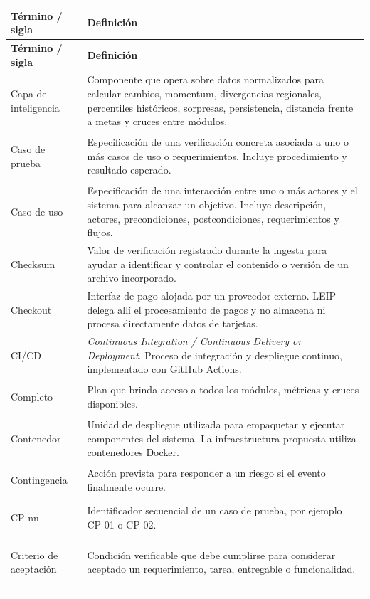 \documentclass[11pt,a4paper]{article}
\makeatletter
\newcommand{\proyectoNombre}{LEIP}
\newenvironment{glosario}{%
  \renewcommand{\arraystretch}{1.18}%
  \begin{longtable}{@{}>{\raggedright\arraybackslash\bfseries}p{4.0cm} >{\raggedright\arraybackslash}p{10.7cm}@{}}
  \toprule
  \textbf{T\'ermino / sigla} & \textbf{Definici\'on} \\
  \midrule
  \endfirsthead
  \toprule
  \textbf{T\'ermino / sigla} & \textbf{Definici\'on} \\
  \midrule
  \endhead
  \bottomrule
  \endfoot
}{%
  \end{longtable}
  \renewcommand{\arraystretch}{1}%
}
\makeatother
\begin{document}
\begin{glosario}
Capa de inteligencia & Componente que opera sobre datos normalizados para calcular cambios, momentum, divergencias regionales, percentiles hist\'oricos, sorpresas, persistencia, distancia frente a metas y cruces entre m\'odulos. \\
\addlinespace

Caso de prueba & Especificaci\'on de una verificaci\'on concreta asociada a uno o m\'as casos de uso o requerimientos. Incluye procedimiento y resultado esperado. \\
\addlinespace

Caso de uso & Especificaci\'on de una interacci\'on entre uno o m\'as actores y el sistema para alcanzar un objetivo. Incluye descripci\'on, actores, precondiciones, postcondiciones, requerimientos y flujos. \\
\addlinespace

Checksum & Valor de verificaci\'on registrado durante la ingesta para ayudar a identificar y controlar el contenido o versi\'on de un archivo incorporado. \\
\addlinespace

Checkout & Interfaz de pago alojada por un proveedor externo. \proyectoNombre{} delega all\'i el procesamiento de pagos y no almacena ni procesa directamente datos de tarjetas. \\
\addlinespace

CI/CD & \emph{Continuous Integration / Continuous Delivery or Deployment}. Proceso de integraci\'on y despliegue continuo, implementado con GitHub Actions. \\
\addlinespace

Completo & Plan que brinda acceso a todos los m\'odulos, m\'etricas y cruces disponibles. \\
\addlinespace

Contenedor & Unidad de despliegue utilizada para empaquetar y ejecutar componentes del sistema. La infraestructura propuesta utiliza contenedores Docker. \\
\addlinespace

Contingencia & Acci\'on prevista para responder a un riesgo si el evento finalmente ocurre. \\
\addlinespace

CP-nn & Identificador secuencial de un caso de prueba, por ejemplo CP-01 o CP-02. \\
\addlinespace

Criterio de aceptaci\'on & Condici\'on verificable que debe cumplirse para considerar aceptado un requerimiento, tarea, entregable o funcionalidad. \\
\addlinespace


\end{glosario}
\end{document}
